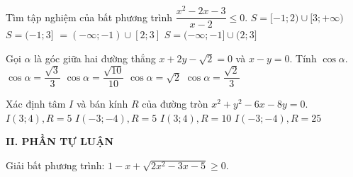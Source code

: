 \begin{ex}%
	Tìm tập nghiệm của bất phương trình $\dfrac{x^2-2x-3}{x-2}\leq 0$.
	\choice
	{$S=[-1; 2) \cup [3; +\infty)$}
	{$S=(-1; 3]$}
	{$=(-\infty ; -1) \cup [2; 3]$}
	{\True $S=(-\infty ; -1] \cup (2; 3]$}
\end{ex}
\begin{ex}%
	Gọi $\alpha$ là góc giữa hai đường thẳng $x+2y-\sqrt{2}=0$ và $x-y=0$. 
	Tính $\cos \alpha $.
	\choice
	{$\cos \alpha =\dfrac{\sqrt{3}}{3}$}
	{\True $\cos \alpha= \dfrac{\sqrt{10}}{10}$}
	{$\cos \alpha =\sqrt{2}$}
	{$\cos \alpha =\dfrac{\sqrt{2}}{3}$}
\end{ex}
\begin{ex}%
	Xác định tâm $I$ và bán kính $R$ của đường tròn $x^2+y^2-6x-8y=0$.
	\choice
	{\True $I(3; 4), R=5$}
	{$I(-3; -4), R=5$}
	{$I(3; 4), R=10$}
	{$I(-3; -4), R=25$}
\end{ex}
\noindent\textbf{II. PHẦN TỰ LUẬN}
\begin{bt}%
	Giải bất phương trình: $1-x+\sqrt{2x^2-3x-5}\geq 0$.
	\loigiai{$1-x+\sqrt{2x^2-3x-5}\geq 0\Leftrightarrow \hoac{&\heva{&x-1<0\\& 2x^2-3x-5\geq 0}\\&\heva{&x-1\geq 0\\& 2x^2-3x-5\geq (x-1)^2}}\Leftrightarrow \hoac{&x\leq -1\\& x\geq 3}.$\\
	Vậy bất phương trình có tập nghiệm $(-\infty; -1]\cup[3; +\infty)$.}
\end{bt}

